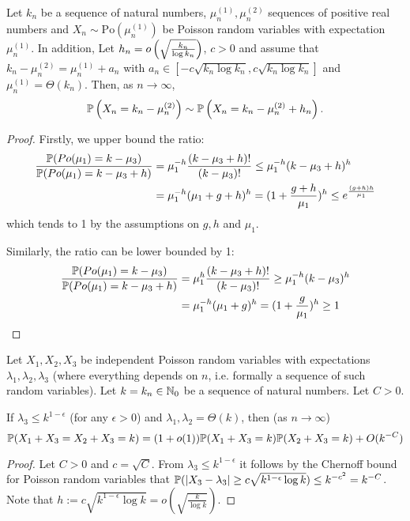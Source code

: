 \begin{appendices}
\begin{lemma}\label{lem:Poissonstab}
Let $k_n$ be a sequence of natural numbers, $\mu_n^{(1)}, \mu_n^{(2)}$ sequences of positive real numbers and $X_n \sim \mathrm{Po}(\mu_n^{(1)})$ be Poisson random variables with expectation $\mu_n^{(1)}$. In addition, Let $h_n = o\left(\sqrt{\frac{k_n}{\log k_n}}\right)$, $c > 0$ and assume that $k_n-\mu_n^{(2)} = \mu_n^{(1)}+a_n$ with $a_n \in [-c\sqrt{k_n\log k_n},c\sqrt{k_n\log k_n}]$ and $\mu_n^{(1)}=\Theta(k_n)$. 
Then, as $n \to \infty$,
\[
	\mathbb{P}\left(X_n = k_n - \mu_n^{(2)}\right) \sim \mathbb{P}\left(X_n = k_n - \mu_n^{(2)} + h_n\right).
\]
\end{lemma}
\begin{proof}
	Firstly, we upper bound the ratio:
	\begin{align*}
	\frac{\mathbb{P}(Po(\mu_1)=k-\mu_3)}{\mathbb{P}(Po(\mu_1)=k-\mu_3 +h)} &= \mu_1^{-h} \frac{(k-\mu_3+h)!}{(k-\mu_3)!}  \leq \mu_1^{-h} (k-\mu_3+h)^h\\
	 &= \mu_1^{-h} (\mu_1+g+h)^h = (1+\frac{g+h}{\mu_1})^h \leq e^{\frac{(g+h)h}{\mu_1}}
	\end{align*}
	which tends to 1 by the assumptions on $g,h$ and $\mu_1$.
	
	Similarly, the ratio can be lower bounded by 1:
	\begin{align*}
	\frac{\mathbb{P}(Po(\mu_1)=k-\mu_3)}{\mathbb{P}(Po(\mu_1)=k-\mu_3 +h)} &= \mu_1^{h} \frac{(k-\mu_3+h)!}{(k-\mu_3)!}  \geq \mu_1^{-h} (k-\mu_3)^h\\
	 &= \mu_1^{-h} (\mu_1+g)^h = (1+\frac{g}{\mu_1})^h \geq 1 
	\end{align*}
\end{proof}

\begin{lemma}\label{lem:joint_distribution_Poisson}
	Let $X_1, X_2, X_3$ be independent Poisson random variables with expectations $\lambda_1, \lambda_2, \lambda_3$ (where everything depends on $n$, i.e. formally a sequence of such random variables). Let $k=k_n \in \mathbb{N}_0$ be a sequence of natural numbers. Let $C>0$.
	
	If $\lambda_3 \leq  k^{1-\epsilon}$ (for any $\epsilon>0$) and $\lambda_1, \lambda_2 = \Theta(k)$, %
	then (as $n \rightarrow \infty$) 
	$$\mathbb{P}(X_1+X_3=X_2+X_3=k) =(1+o(1)) \mathbb{P}(X_1+X_3=k)\mathbb{P}(X_2+X_3=k)+O(k^{-C})$$
\end{lemma}
\begin{proof}
Let $C>0$ and $c = \sqrt{C}$.
From $\lambda_3 \leq k^{1-\epsilon}$ it follows by the Chernoff bound for Poisson random variables that $\mathbb{P}(|X_3-\lambda_3| \geq c\sqrt{k^{1-\epsilon} \log k}) \leq k^{-c^2} = k^{-C}$. Note that $h:= c\sqrt{k^{1-\epsilon} \log k} = o(\sqrt{\frac{k}{\log k}})$.


\end{proof}
\end{appendices}
